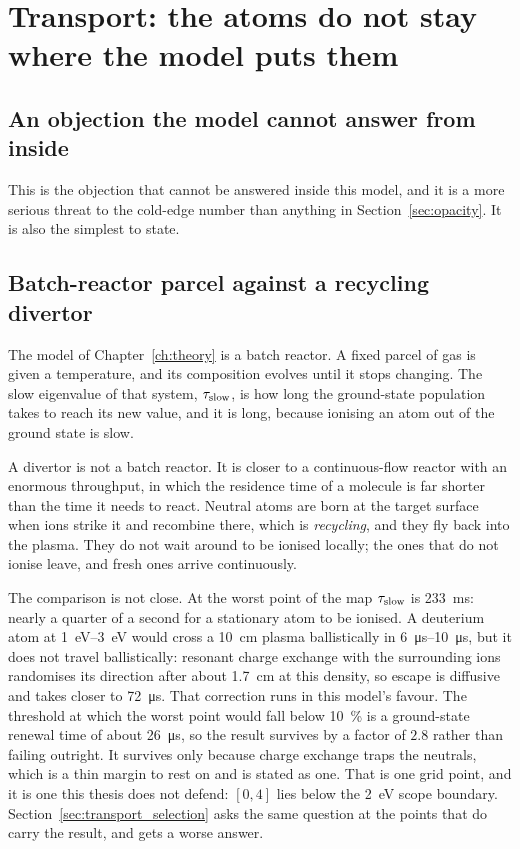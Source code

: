 \section{Transport: the atoms do not stay where the model puts them}
\label{sec:transport}

\subsection{An objection the model cannot answer from inside}

This is the objection that cannot be answered inside this model, and it is a
more serious threat to the cold-edge number than anything in
Section~\ref{sec:opacity}. It is also the simplest to state.

\subsection{Batch-reactor parcel against a recycling divertor}

The model of Chapter~\ref{ch:theory} is a batch reactor. A fixed parcel of gas
is given a temperature, and its composition evolves until it stops changing. The
slow eigenvalue of that system, $\tau_{\mathrm{slow}}$, is how long the ground-state
population takes to reach its new value, and it is long, because ionising an
atom out of the ground state is slow.

A divertor is not a batch reactor. It is closer to a continuous-flow reactor
with an enormous throughput, in which the residence time of a molecule is far
shorter than the time it needs to react. Neutral atoms are born at the target
surface when ions strike it and recombine there, which is \emph{recycling},
and they fly back into the plasma. They do not wait around to be ionised
locally; the ones that do not ionise leave, and fresh ones arrive continuously.

The comparison is not close. At the worst point of the map $\tau_{\mathrm{slow}}$ is
\SI{233}{\milli\second}: nearly a quarter of a second for a stationary atom to
be ionised. A deuterium atom at \SIrange{1}{3}{\electronvolt} would cross a
\SI{10}{\centi\metre} plasma ballistically in \SIrange{6}{10}{\micro\second}, but
it does not travel ballistically: resonant charge exchange with the surrounding
ions randomises its direction after about \SI{1.7}{\centi\metre} at this
density, so escape is diffusive and takes closer to \SI{72}{\micro\second}. That
correction runs in this model's favour. The threshold at which the worst point
would fall below \SI{10}{\percent} is a ground-state renewal time of about
\SI{26}{\micro\second}, so the result survives by a factor of $2.8$ rather than
failing outright. It survives only because charge exchange traps the neutrals,
which is a thin margin to rest on and is stated as one.
That is one grid point, and it is one this thesis does not defend:
$[0,4]$ lies below the \SI{2}{\electronvolt} scope boundary.
Section~\ref{sec:transport_selection} asks the same question at the points that
do carry the result, and gets a worse answer.

